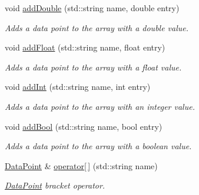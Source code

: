 \begin{DoxyCompactItemize}
void \mbox{\hyperlink{class_arcana_1_1_event_1_1_data_a5ad2885d6ad41e64b51e6729331be939}{add\+Double}} (std\+::string name, double entry)
\begin{DoxyCompactList}\small\item\em Adds a data point to the array with a double value. \end{DoxyCompactList}\item 
\mbox{\label{class_arcana_1_1_event_1_1_data_ac1cdbf3af77054c8931b0f0b1f9bb354}} 
void \mbox{\hyperlink{class_arcana_1_1_event_1_1_data_ac1cdbf3af77054c8931b0f0b1f9bb354}{add\+Float}} (std\+::string name, float entry)
\begin{DoxyCompactList}\small\item\em Adds a data point to the array with a float value. \end{DoxyCompactList}\item 
\mbox{\label{class_arcana_1_1_event_1_1_data_a55450bb60c419221c5c5649331ef0bc8}} 
void \mbox{\hyperlink{class_arcana_1_1_event_1_1_data_a55450bb60c419221c5c5649331ef0bc8}{add\+Int}} (std\+::string name, int entry)
\begin{DoxyCompactList}\small\item\em Adds a data point to the array with an integer value. \end{DoxyCompactList}\item 
\mbox{\label{class_arcana_1_1_event_1_1_data_aad93720f1ef41b1ac7e561a497c9205c}} 
void \mbox{\hyperlink{class_arcana_1_1_event_1_1_data_aad93720f1ef41b1ac7e561a497c9205c}{add\+Bool}} (std\+::string name, bool entry)
\begin{DoxyCompactList}\small\item\em Adds a data point to the array with a boolean value. \end{DoxyCompactList}\item 
\mbox{\hyperlink{struct_arcana_1_1_event_1_1_data_point}{Data\+Point}} \& \mbox{\hyperlink{class_arcana_1_1_event_1_1_data_ad9fd4aac39a9741d92bb5723b973d3e1}{operator\mbox{[}$\,$\mbox{]}}} (std\+::string name)
\begin{DoxyCompactList}\small\item\em \mbox{\hyperlink{struct_arcana_1_1_event_1_1_data_point}{Data\+Point}} bracket operator. \end{DoxyCompactList}\item 

\end{DoxyCompactItemize}
